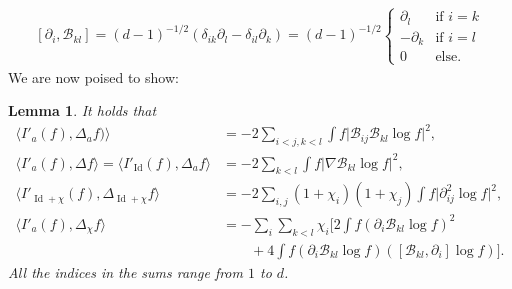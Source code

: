 \documentclass[11pt,a4paper]{article}
\theoremstyle{definition}
\theoremstyle{plain}
\newtheorem{lemma}[defi]{Lemma}
\DeclareMathOperator*{\Id}{Id}
\newcommand{\jap}[1]{\langle #1 \rangle}
\begin{document}
\begin{align}
\label{eq:commutator}
    [\partial_i,\mathcal{B}_{kl}]=(d-1)^{-1/2}\left(\delta_{ik}\partial_l-\delta_{il}\partial_k\right)=(d-1)^{-1/2}\begin{cases}
        \partial_l & \text{if }i=k \\
        -\partial_k & \text{if }i=l \\
        0 & \text{else.}
    \end{cases}
\end{align}
We are now poised to show:
\begin{lemma} 
\label{lem:niceterms}
It holds that
\begin{align}
\label{eq:I'a,a}
    \jap{I'_{a}(f),\Delta_a f)}&=-2\sum_{i<j,k<l}\int f \vert \mathcal{B}_{ij}\mathcal{B}_{kl}\log f\vert^2,\\
\label{eq:I'a,Id}
    \jap{I'_{a}(f),\Delta f}=\jap{I'_{\Id}(f),\Delta_a f}&=-2\sum_{k<l}\int f \vert \nabla\mathcal{B}_{kl} \log f\vert^2,\\
\label{eq:I'id+chi,id+chi}
    \jap{I'_{\Id+\chi}(f),\Delta_{\Id+\chi} f}&=-2\sum_{i,j}(1+\chi_i)(1+\chi_j)\int f \vert \partial_{ij}^2 \log f\vert^2,\\
\label{eq:I'a,chi}
    \jap{I'_a(f),\Delta_\chi f}&=-\sum_i\!\sum_{k<l}\chi_i\bigg[2\int f(\partial_i\mathcal{B}_{kl} \log f)^2\\
    \nonumber
    &\qquad +4\int f(\partial_i\mathcal{B}_{kl} \log f)([\mathcal{B}_{kl},\partial_i]\log f) \bigg].
\end{align}
All the indices in the sums range from $1$ to $d$.
\end{lemma}
\end{document}
